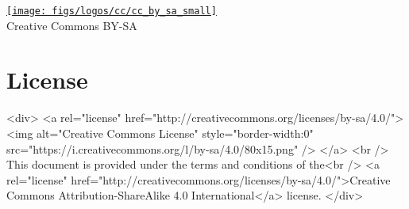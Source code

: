 \ifpdf

    \vfill %
    \begin{center}
        \href{http://creativecommons.org/licenses/by-sa/4.0/}{\texttt{[image: figs/logos/cc/cc\_by\_sa\_small]}}\\
        \small{Creative Commons BY-SA}
    \end{center}

\else

    \section*{License}\label{sec:license}

    \begin{rawhtml}

        <div>
            <a rel="license" href="http://creativecommons.org/licenses/by-sa/4.0/">
                <img alt="Creative Commons License" style="border-width:0" src="https://i.creativecommons.org/l/by-sa/4.0/80x15.png" />
            </a>
            <br />
            This document is provided under the terms and conditions of the<br />
            <a rel="license" href="http://creativecommons.org/licenses/by-sa/4.0/">Creative Commons Attribution-ShareAlike 4.0 International</a>
            license.
        </div>

    \end{rawhtml}

\fi
